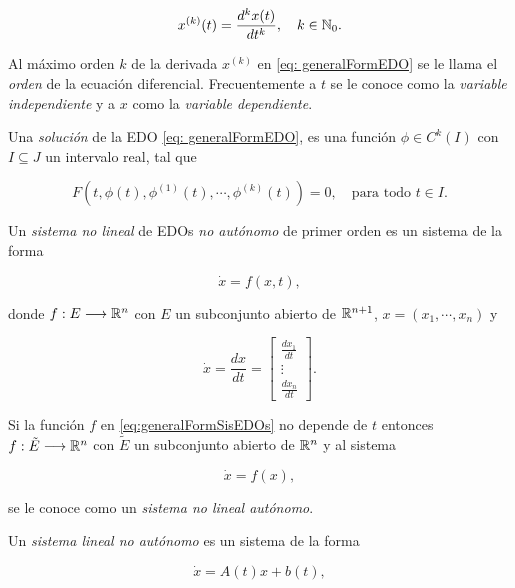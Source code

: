 \begin{equation*}
	x^{(k)}(t) = \frac{d^{k}x(t)}{dt^{k}}, \quad k \in {\mathbb{N}}_{0}.
\end{equation*}

Al máximo orden $k$ de la derivada $x^{(k)}$ en \eqref{eq: generalFormEDO} se le llama el \textit{orden} de la ecuación diferencial. Frecuentemente a $t$ se le conoce como la \textit{variable independiente} y a $x$ como la \textit{variable dependiente}.

Una \textit{solución} de la EDO \eqref{eq: generalFormEDO}, es una función $\phi \in C^{k}(I)$ con $I \subseteq J$ un intervalo real, tal que

\begin{equation}
	F(t, \phi(t), \phi^{(1)}(t), \cdots, \phi^{(k)}(t)) = 0, \quad \text{para todo } t \in I.
\end{equation}

Un \textit{sistema no lineal} de EDOs \textit{no autónomo} de primer orden es un sistema de la forma

\begin{equation}
	\dot{x} = f(x, t),
	\label{eq:generalFormSisEDOs}
\end{equation}

donde $f:E \longrightarrow {\mathbb{R}}^{n}$ con $E$ un subconjunto abierto de ${\mathbb{R}}^{n+1}$, $x = (x_{1}, \cdots, x_{n})$ y

\begin{equation*}
	\dot{x} = \frac{dx}{dt} = 
	\begin{bmatrix}
		\frac{dx_{1}}{dt} \\
		\vdots \\
		\frac{dx_{n}}{dt}
	\end{bmatrix}.
\end{equation*}

Si la función $f$ en \eqref{eq:generalFormSisEDOs} no depende de $t$ entonces $f:\tilde{E} \longrightarrow {\mathbb{R}}^{n}$ con $\tilde{E}$ un subconjunto abierto de ${\mathbb{R}}^{n}$ y al sistema 

\begin{equation}
	\dot{x} = f(x),
	\label{eq: sisAut}
\end{equation} 

se le conoce como un \textit{sistema no lineal autónomo}.

Un \textit{sistema lineal no autónomo} es un sistema de la forma

\begin{equation}
	\dot{x} = A(t)x + b(t),
	\label{eq: sistemaLineal}
\end{equation}

